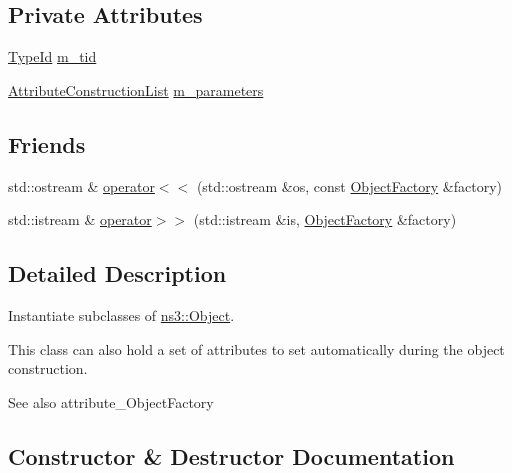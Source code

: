 \subsection*{Private Attributes}
\begin{DoxyCompactItemize}
\item 
\hyperlink{classns3_1_1TypeId}{Type\+Id} \hyperlink{classns3_1_1ObjectFactory_a8ca23503729ed332d29c5106d2e750f5}{m\+\_\+tid}
\item 
\hyperlink{classns3_1_1AttributeConstructionList}{Attribute\+Construction\+List} \hyperlink{classns3_1_1ObjectFactory_ad0f5d67c7039a3c60a80a0030bc9ca48}{m\+\_\+parameters}
\end{DoxyCompactItemize}
\subsection*{Friends}
\begin{DoxyCompactItemize}
\item 
std\+::ostream \& \hyperlink{classns3_1_1ObjectFactory_a2b57d69e2e93db250b04f4819033238e}{operator$<$$<$} (std\+::ostream \&os, const \hyperlink{classns3_1_1ObjectFactory}{Object\+Factory} \&factory)
\item 
std\+::istream \& \hyperlink{classns3_1_1ObjectFactory_a73e69127dbdfbec1915172786a920a47}{operator$>$$>$} (std\+::istream \&is, \hyperlink{classns3_1_1ObjectFactory}{Object\+Factory} \&factory)
\end{DoxyCompactItemize}


\subsection{Detailed Description}
Instantiate subclasses of \hyperlink{classns3_1_1Object}{ns3\+::\+Object}. 

This class can also hold a set of attributes to set automatically during the object construction.

\begin{DoxySeeAlso}{See also}
attribute\+\_\+\+Object\+Factory 
\end{DoxySeeAlso}


\subsection{Constructor \& Destructor Documentation}
